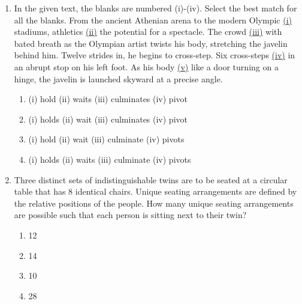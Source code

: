 \documentclass[journal,12pt,onecolumn]{IEEEtran}
\begin{document}
\begin{enumerate}
\item In the given text, the blanks are numbered (i)-(iv). Select the best match for all the blanks.
From the ancient Athenian arena to the modern Olympic \underline{\hspace{0.5cm}(i)\hspace{0.5cm}} stadiums, athletics \underline{\hspace{0.5cm}(ii)\hspace{0.5cm}} the potential for a spectacle. The crowd \underline{\hspace{0.5cm}(iii)\hspace{0.5cm}} with bated breath as the Olympian artist twists his body, stretching the javelin behind him. Twelve strides in, he begins to cross-step. Six cross-steps \underline{\hspace{0.5cm}(iv)\hspace{0.5cm}} in an abrupt stop on his left foot. As his body \underline{\hspace{0.5cm}(v)\hspace{0.5cm}} like a door turning on a hinge, the javelin is launched skyward at a precise angle.

\hfill{}

\begin{enumerate}
    \item (i) hold (ii) waits (iii) culminates (iv) pivot
    \item (i) holds (ii) wait (iii) culminates (iv) pivot
    \item (i) hold (ii) wait (iii) culminate (iv) pivots
    \item (i) holds (ii) waits (iii) culminate (iv) pivots
\end{enumerate}

\item Three distinct sets of indistinguishable twins are to be seated at a circular table that has 8 identical chairs. Unique seating arrangements are defined by the relative positions of the people. How many unique seating arrangements are possible such that each person is sitting next to their twin?

\hfill{}

\begin{multicols}{4}
\begin{enumerate}
    \item 12
    \item 14
    \item 10
    \item 28
\end{enumerate}
\end{multicols}


\end{enumerate}
\end{document}
